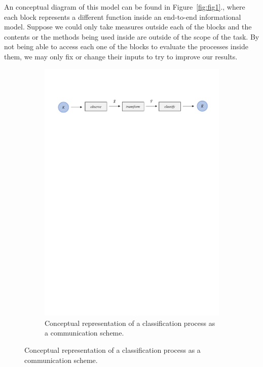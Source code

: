 An conceptual diagram of this model can be found in Figure~\ref{fig:fig1}., where each block represents a different function inside an end-to-end informational model. Suppose we could only take measures outside each of the blocks and the contents or the methods being used inside are outside of the scope of the task. By not being able to access each one of the blocks to evaluate the processes inside them, we may only fix or change their inputs to try to improve our results.
%
\begin{figure}[H]
	\begin{subfigure}{1\textwidth}  
		\centering
		\includegraphics[width=16cm]{Figuras_tfg/Figura1_tfg}
		\caption{Conceptual representation of a classification process as a communication scheme.}
		\label{fig:fig1b} 
	\end{subfigure}%
	

\end{figure}
